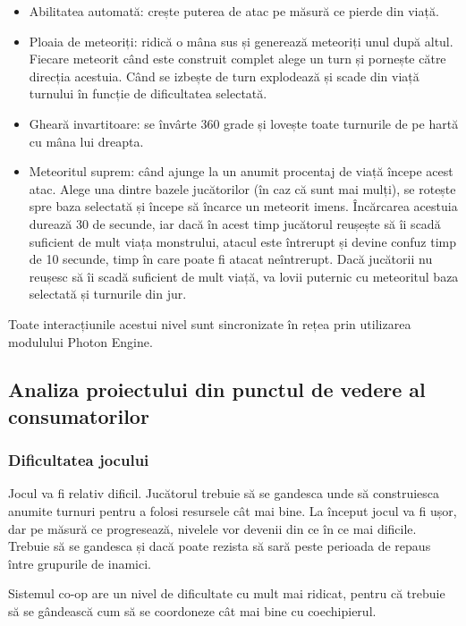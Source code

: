\documentclass[12pt, a4paper]{article}
\begin{document}
	\begin{itemize}
		\item Abilitatea automată: crește puterea de atac pe măsură ce pierde din viață.
		\item Ploaia de meteoriți: ridică o mâna sus și generează meteoriți unul după altul. Fiecare meteorit când este construit complet alege un turn și pornește către direcția acestuia. Când se izbește de turn explodează și scade din viață turnului în funcție de dificultatea selectată.
		\item Gheară invartitoare: se învârte 360 grade și lovește toate turnurile de pe hartă cu mâna lui dreapta.
		\item Meteoritul suprem: când ajunge la un anumit procentaj de viață începe acest atac. Alege una dintre bazele jucătorilor (în caz că sunt mai mulți), se rotește spre baza selectată și începe să încarce un meteorit imens. Încărcarea acestuia durează 30 de secunde, iar dacă în acest timp jucătorul reușește să îi scadă suficient de mult viața monstrului, atacul este întrerupt și devine confuz timp de 10 secunde, timp în care poate fi atacat neîntrerupt. Dacă jucătorii nu reușesc să îi scadă suficient de mult viață, va lovii puternic cu meteoritul baza selectată și turnurile din jur.
	\end{itemize}
	
	Toate interacțiunile acestui nivel sunt sincronizate în rețea prin utilizarea modulului Photon Engine.
	
	
	
	
	
	\subsection{Analiza proiectului din punctul de vedere al consumatorilor}
	
	\subsubsection{Dificultatea jocului}
	
	Jocul va fi relativ dificil. Jucătorul trebuie să se gandesca unde să construiesca anumite turnuri pentru a folosi resursele cât mai bine. La început jocul va fi ușor, dar pe măsură ce progresează, nivelele vor devenii din ce în ce mai dificile. Trebuie să se gandesca și dacă poate rezista să sară peste perioada de repaus între grupurile de inamici.
	\newline
	
	Sistemul co-op are un nivel de dificultate cu mult mai ridicat, pentru că trebuie să se gândească cum să se coordoneze cât mai bine cu coechipierul.
	
\end{document}
